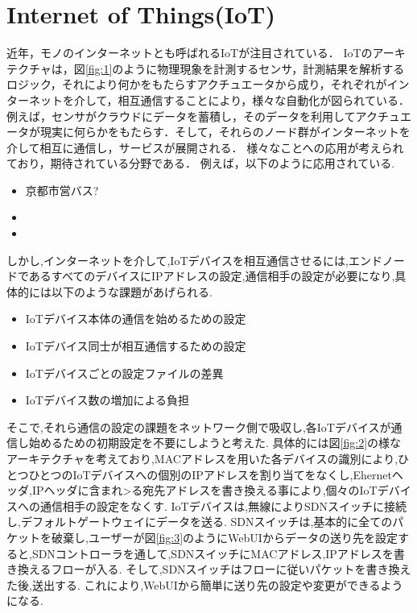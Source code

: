 \documentclass{jsarticle}
\begin{document}
\section{Internet of Things(IoT)}
	近年，モノのインターネットとも呼ばれるIoTが注目されている．
	IoTのアーキテクチャは，図\ref{fig:1}のように物理現象を計測するセンサ，計測結果を解析するロジック，それにより何かをもたらすアクチュエータから成り，それぞれがインターネットを介して，相互通信することにより，様々な自動化が図られている．
	例えば，センサがクラウドにデータを蓄積し，そのデータを利用してアクチュエータが現実に何らかをもたらす．そして，それらのノード群がインターネットを介して相互に通信し，サービスが展開される．
	様々なことへの応用が考えられており，期待されている分野である．
	例えば，以下のように応用されている.
	\begin{itemize}
		\item 京都市営バス?
		\item
		\item
	\end{itemize}
	しかし,インターネットを介して,IoTデバイスを相互通信させるには,エンドノードであるすべてのデバイスにIPアドレスの設定,通信相手の設定が必要になり,具体的には以下のような課題があげられる.
	\begin{itemize}
		\item IoTデバイス本体の通信を始めるための設定
		\item IoTデバイス同士が相互通信するための設定
		\item IoTデバイスごとの設定ファイルの差異
		\item IoTデバイス数の増加による負担
	\end{itemize}
	そこで,それら通信の設定の課題をネットワーク側で吸収し,各IoTデバイスが通信し始めるための初期設定を不要にしようと考えた.
	具体的には図\ref{fig:2}の様なアーキテクチャを考えており,MACアドレスを用いた各デバイスの識別により,ひとつひとつのIoTデバイスへの個別のIPアドレスを割り当てをなくし,Ehernetヘッダ,IPヘッダに含まれ>る宛先アドレスを書き換える事により,個々のIoTデバイスへの通信相手の設定をなくす.
	IoTデバイスは,無線によりSDNスイッチに接続し,デフォルトゲートウェイにデータを送る.
	SDNスイッチは,基本的に全てのパケットを破棄し,ユーザーが図\ref{fig:3}のようにWebUIからデータの送り先を設定すると,SDNコントローラを通して,SDNスイッチにMACアドレス,IPアドレスを書き換えるフローが入る.
	そして,SDNスイッチはフローに従いパケットを書き換えた後,送出する.
	これにより,WebUIから簡単に送り先の設定や変更ができるようになる.
\end{document}
